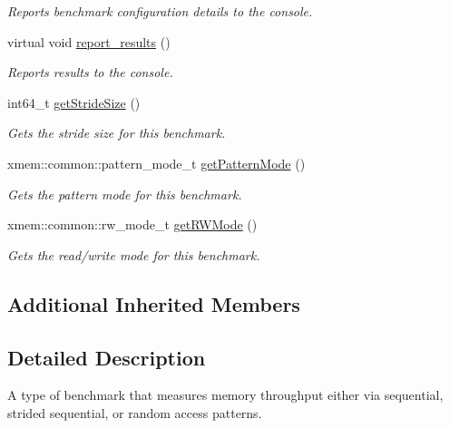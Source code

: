 \begin{DoxyCompactItemize}
\begin{DoxyCompactList}\small\item\em Reports benchmark configuration details to the console. \end{DoxyCompactList}\item 
\hypertarget{classxmem_1_1benchmark_1_1_throughput_benchmark_a7df909bd544d1399e756a98bfbce2561}{virtual void \hyperlink{classxmem_1_1benchmark_1_1_throughput_benchmark_a7df909bd544d1399e756a98bfbce2561}{report\-\_\-results} ()}\label{classxmem_1_1benchmark_1_1_throughput_benchmark_a7df909bd544d1399e756a98bfbce2561}

\begin{DoxyCompactList}\small\item\em Reports results to the console. \end{DoxyCompactList}\item 
int64\-\_\-t \hyperlink{classxmem_1_1benchmark_1_1_throughput_benchmark_ad31b0fecafb174be0509581cda099d55}{get\-Stride\-Size} ()
\begin{DoxyCompactList}\small\item\em Gets the stride size for this benchmark. \end{DoxyCompactList}\item 
xmem\-::common\-::pattern\-\_\-mode\-\_\-t \hyperlink{classxmem_1_1benchmark_1_1_throughput_benchmark_a2c7dc699b2ae013edd9de871778dff7b}{get\-Pattern\-Mode} ()
\begin{DoxyCompactList}\small\item\em Gets the pattern mode for this benchmark. \end{DoxyCompactList}\item 
xmem\-::common\-::rw\-\_\-mode\-\_\-t \hyperlink{classxmem_1_1benchmark_1_1_throughput_benchmark_acd839b1c7a1d51ff3ce7921a36d65e98}{get\-R\-W\-Mode} ()
\begin{DoxyCompactList}\small\item\em Gets the read/write mode for this benchmark. \end{DoxyCompactList}\end{DoxyCompactItemize}
\subsection*{Additional Inherited Members}


\subsection{Detailed Description}
A type of benchmark that measures memory throughput either via sequential, strided sequential, or random access patterns. 


